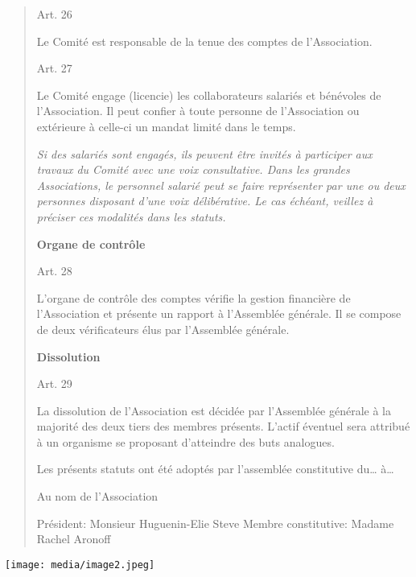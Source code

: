 \documentclass[
]{article}
\begin{document}
\begin{quote}
Art. 26

Le Comité est responsable de la tenue des comptes de l'Association.

Art. 27

Le Comité engage (licencie) les collaborateurs salariés et bénévoles de
l'Association. Il peut confier à toute personne de l'Association ou
extérieure à celle-ci un mandat limité dans le temps.

\emph{Si des salariés sont engagés, ils peuvent être invités à
participer aux travaux du Comité avec une voix consultative. Dans les
grandes Associations, le personnel salarié peut se faire représenter par
une ou deux personnes disposant d'une voix délibérative. Le cas échéant,
veillez à préciser ces modalités dans les statuts.}

\textbf{Organe de contrôle}

Art. 28

L'organe de contrôle des comptes vérifie la gestion financière de
l'Association et présente un rapport à l'Assemblée générale. Il se
compose de deux vérificateurs élus par l'Assemblée générale.

\textbf{Dissolution}

Art. 29

La dissolution de l'Association est décidée par l'Assemblée générale à
la majorité des deux tiers des membres présents. L'actif éventuel sera
attribué à un organisme se proposant d'atteindre des buts analogues.

Les présents statuts ont été adoptés par l'assemblée constitutive
du\ldots{} à\ldots{}

Au nom de l'Association

Président: Monsieur Huguenin-Elie Steve
Membre constitutive: Madame Rachel Aronoff
\end{quote}

\texttt{[image: media/image2.jpeg]}
\end{document}
